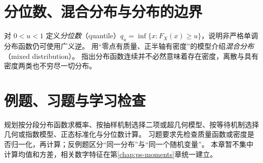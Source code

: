 \section{分位数、混合分布与分布的边界}
\label{sec:ps-quantiles-mixtures}
对 $0<u<1$ 定义\emph{分位数}（quantile）$q_u=\inf\{x:F_X(x)\geq u\}$，说明非严格单调分布函数仍可使用广义逆。
用“零点有质量、正半轴有密度”的模型介绍\emph{混合分布}（mixed distribution）。
指出分布函数连续并不必然意味着存在密度，离散与具有密度两类也不穷尽一切分布。

\section{例题、习题与学习检查}
规划按分段分布函数求概率、按抽样机制选择二项或超几何模型、按等待机制选择几何或指数模型、正态标准化与分位数计算。
习题要求先检查质量函数或密度是否归一化，再计算；反例题区分“同一分布”与“同一个随机变量”。
本章暂不集中计算均值和方差，相关数字特征在第\ref{chap:ps-moments}章统一建立。






